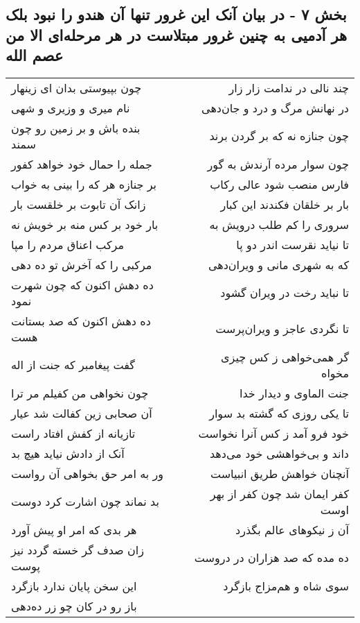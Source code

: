 \begin{center}
\section*{بخش ۷ - در بیان آنک این غرور تنها آن هندو را نبود بلک هر آدمیی به چنین غرور مبتلاست در هر مرحله‌ای الا من عصم الله}
\label{sec:sh007}
\begin{longtable}{l p{0.5cm} r}
چون بپیوستی بدان ای زینهار
&&
چند نالی در ندامت زار زار
\\
نام میری و وزیری و شهی
&&
در نهانش مرگ و درد و جان‌دهی
\\
بنده باش و بر زمین رو چون سمند
&&
چون جنازه نه که بر گردن برند
\\
جمله را حمال خود خواهد کفور
&&
چون سوار مرده آرندش به گور
\\
بر جنازه هر که را بینی به خواب
&&
فارس منصب شود عالی رکاب
\\
زانک آن تابوت بر خلقست بار
&&
بار بر خلقان فکندند این کبار
\\
بار خود بر کس منه بر خویش نه
&&
سروری را کم طلب درویش به
\\
مرکب اعناق مردم را مپا
&&
تا نیاید نقرست اندر دو پا
\\
مرکبی را که آخرش تو ده دهی
&&
که به شهری مانی و ویران‌دهی
\\
ده دهش اکنون که چون شهرت نمود
&&
تا نباید رخت در ویران گشود
\\
ده دهش اکنون که صد بستانت هست
&&
تا نگردی عاجز و ویران‌پرست
\\
گفت پیغامبر که جنت از اله
&&
گر همی‌خواهی ز کس چیزی مخواه
\\
چون نخواهی من کفیلم مر ترا
&&
جنت الماوی و دیدار خدا
\\
آن صحابی زین کفالت شد عیار
&&
تا یکی روزی که گشته بد سوار
\\
تازیانه از کفش افتاد راست
&&
خود فرو آمد ز کس آنرا نخواست
\\
آنک از دادش نیاید هیچ بد
&&
داند و بی‌خواهشی خود می‌دهد
\\
ور به امر حق بخواهی آن رواست
&&
آنچنان خواهش طریق انبیاست
\\
بد نماند چون اشارت کرد دوست
&&
کفر ایمان شد چون کفر از بهر اوست
\\
هر بدی که امر او پیش آورد
&&
آن ز نیکوهای عالم بگذرد
\\
زان صدف گر خسته گردد نیز پوست
&&
ده مده که صد هزاران در دروست
\\
این سخن پایان ندارد بازگرد
&&
سوی شاه و هم‌مزاج بازگرد
\\
باز رو در کان چو زر ده‌دهی

\end{longtable}
\end{center}

